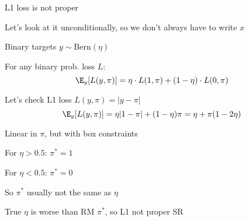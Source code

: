 \documentclass[11pt,compress,t,notes=noshow, xcolor=table]{beamer}
\begin{document}
\begin{framei}[sep=M]{L1 loss is not proper}


\item Let's look at it unconditionally, so we don't always have to write $x$
    
\item Binary targets $y \sim \text{Bern}(\eta)$ %


\item For any binary prob. loss $L$:
$$\E_{y}[L(y, \pi)]=\eta \cdot L(1, \pi) + (1-\eta) \cdot L(0, \pi)$$

\item Let's check L1 loss $L(y, \pi)=|y-\pi|$
$$\E_y[L(y, \pi)]=\eta |1-\pi| + (1-\eta) \pi = \eta+\pi(1-2\eta)$$

\item Linear in $\pi$, but with box constraints


\item For $\eta > 0.5$: $\pi^{\ast} =1$ 

\item For $\eta < 0.5$: $\pi^{\ast} = 0$

\item So $\pi^{\ast}$ usually not the same as $\eta$

\item True $\eta$ is worse than RM $\pi^{\ast}$, so L1 not proper SR



\end{framei}
\end{document}
